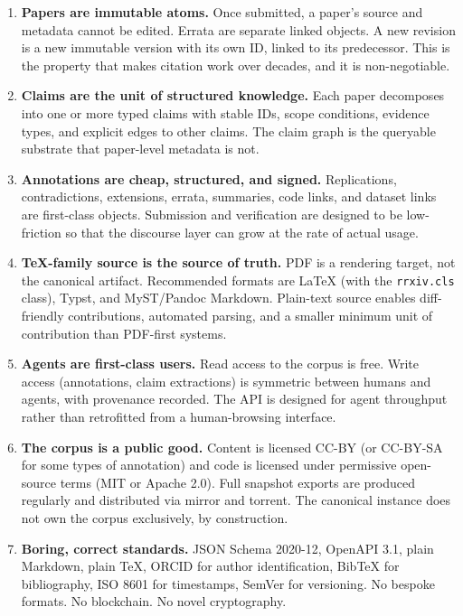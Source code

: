 \documentclass[11pt]{rrxiv}
\begin{document}
\begin{enumerate}[leftmargin=2em, itemsep=0.4em]

\item \textbf{Papers are immutable atoms.} Once submitted, a paper's source and metadata cannot be edited. Errata are separate linked objects. A new revision is a new immutable version with its own ID, linked to its predecessor. This is the property that makes citation work over decades, and it is non-negotiable.

\item \textbf{Claims are the unit of structured knowledge.} Each paper decomposes into one or more typed claims with stable IDs, scope conditions, evidence types, and explicit edges to other claims. The claim graph is the queryable substrate that paper-level metadata is not.

\item \textbf{Annotations are cheap, structured, and signed.} Replications, contradictions, extensions, errata, summaries, code links, and dataset links are first-class objects. Submission and verification are designed to be low-friction so that the discourse layer can grow at the rate of actual usage.

\item \textbf{TeX-family source is the source of truth.} PDF is a rendering target, not the canonical artifact. Recommended formats are LaTeX (with the \texttt{rrxiv.cls} class), Typst, and MyST/Pandoc Markdown. Plain-text source enables diff-friendly contributions, automated parsing, and a smaller minimum unit of contribution than PDF-first systems.

\item \textbf{Agents are first-class users.} Read access to the corpus is free. Write access (annotations, claim extractions) is symmetric between humans and agents, with provenance recorded. The API is designed for agent throughput rather than retrofitted from a human-browsing interface.

\item \textbf{The corpus is a public good.} Content is licensed CC-BY (or CC-BY-SA for some types of annotation) and code is licensed under permissive open-source terms (MIT or Apache 2.0). Full snapshot exports are produced regularly and distributed via mirror and torrent. The canonical instance does not own the corpus exclusively, by construction.

\item \textbf{Boring, correct standards.} JSON Schema 2020-12, OpenAPI 3.1, plain Markdown, plain TeX, ORCID for author identification, BibTeX for bibliography, ISO 8601 for timestamps, SemVer for versioning. No bespoke formats. No blockchain. No novel cryptography.

\end{enumerate}
\end{document}
